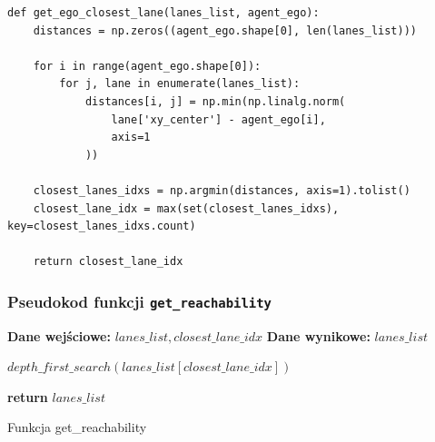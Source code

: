 \begin{verbatim}
def get_ego_closest_lane(lanes_list, agent_ego):
    distances = np.zeros((agent_ego.shape[0], len(lanes_list)))

    for i in range(agent_ego.shape[0]):
        for j, lane in enumerate(lanes_list):
            distances[i, j] = np.min(np.linalg.norm(
                lane['xy_center'] - agent_ego[i],
                axis=1
            ))

    closest_lanes_idxs = np.argmin(distances, axis=1).tolist()
    closest_lane_idx = max(set(closest_lanes_idxs), key=closest_lanes_idxs.count)

    return closest_lane_idx
\end{verbatim}

\subsubsection{Pseudokod funkcji \texttt{get\_reachability}}

\begin{pseudokod}[H]
    \SetAlgoLined
    \DontPrintSemicolon
    \textbf{Dane wejściowe:} $lanes\_list, closest\_lane\_idx$\;
    \textbf{Dane wynikowe:} $lanes\_list$\;
    
    \BlankLine
    
    \BlankLine
    
    \BlankLine
    $depth\_first\_search(lanes\_list[closest\_lane\_idx])$
    
    \BlankLine
    \textbf{return} $lanes\_list$
    
    \caption{Funkcja get\_reachability}
\end{pseudokod}


